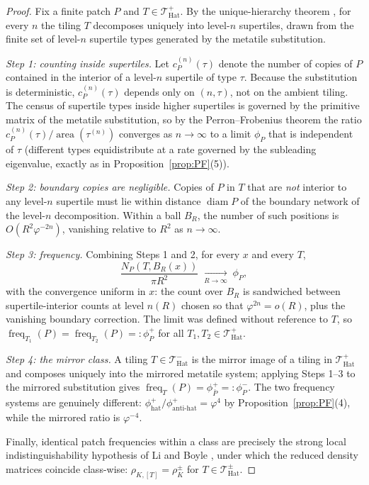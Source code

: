 \documentclass[a4paper,unpublished]{quantumarticle}
\theoremstyle{remark}
\newcommand{\THat}{\mathcal{T}_{\mathrm{Hat}}}
\newcommand{\freq}{\operatorname{freq}}
\newcommand{\rhoK}{\rho_{K}}
\newcommand{\gphi}{\varphi}
\begin{document}
\begin{proof}
Fix a finite patch $P$ and $T \in \THat^{+}$. By the unique-hierarchy
theorem \cite[Thm.~5.1]{Smith2024hat}, for every $n$ the tiling $T$
decomposes uniquely into level-$n$ supertiles, drawn from the finite
set of level-$n$ supertile types generated by the metatile
substitution.

\emph{Step 1: counting inside supertiles.}
Let $c_{P}^{(n)}(\tau)$ denote the number of copies of $P$ contained
in the interior of a level-$n$ supertile of type $\tau$. Because the
substitution is deterministic, $c_{P}^{(n)}(\tau)$ depends only on
$(n, \tau)$, not on the ambient tiling. The census of supertile types
inside higher supertiles is governed by the primitive matrix of the
metatile substitution, so by the Perron--Frobenius theorem the ratio
$c_{P}^{(n)}(\tau) / \operatorname{area}(\tau^{(n)})$ converges as
$n \to \infty$ to a limit $\phi_{P}$ that is independent of $\tau$
(different types equidistribute at a rate governed by the subleading
eigenvalue, exactly as in Proposition~\ref{prop:PF}(5)).

\emph{Step 2: boundary copies are negligible.}
Copies of $P$ in $T$ that are \emph{not} interior to any level-$n$
supertile must lie within distance $\operatorname{diam} P$ of the
boundary network of the level-$n$ decomposition. Within a ball
$B_{R}$, the number of such positions is $O(R^{2} \gphi^{-2n})$,
vanishing relative to $R^{2}$ as $n \to \infty$.

\emph{Step 3: frequency.}
Combining Steps 1 and 2, for every $x$ and every $T$,
\[
\frac{N_{P}(T, B_{R}(x))}{\pi R^{2}}
\;\xrightarrow[R \to \infty]{}\; \phi_{P},
\]
with the convergence uniform in $x$: the count over $B_{R}$ is
sandwiched between supertile-interior counts at level $n(R)$ chosen so
that $\gphi^{2n} = o(R)$, plus the vanishing boundary correction. The
limit was defined without reference to $T$, so
$\freq_{T_{1}}(P) = \freq_{T_{2}}(P) =: \phi^{+}_{P}$ for all
$T_{1}, T_{2} \in \THat^{+}$.

\emph{Step 4: the mirror class.}
A tiling $T \in \THat^{-}$ is the mirror image of a tiling in
$\THat^{+}$ and composes uniquely into the mirrored metatile system;
applying Steps 1--3 to the mirrored substitution gives
$\freq_{T}(P) = \phi^{+}_{\bar P} =: \phi^{-}_{P}$. The two
frequency systems are genuinely different:
$\phi^{+}_{\mathrm{hat}} / \phi^{+}_{\mathrm{anti\text{-}hat}}
= \gphi^{4}$ by Proposition~\ref{prop:PF}(4), while the mirrored
ratio is $\gphi^{-4}$.

Finally, identical patch frequencies within a class are precisely the
strong local indistinguishability hypothesis of Li and Boyle
\cite{LiBoyle2024}, under which the reduced density matrices
coincide class-wise: $\rho_{K, [T]} = \rhoK^{\pm}$ for
$T \in \THat^{\pm}$.
\end{proof}
\end{document}
